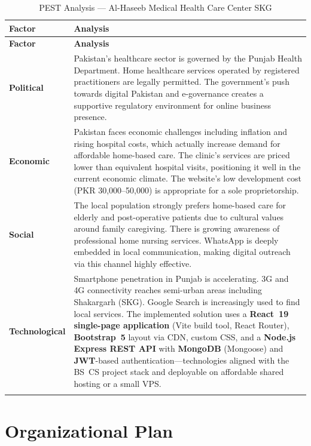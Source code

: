 \documentclass[12pt, a4paper]{article}
\begin{document}
\begin{longtable}{@{} L{3.2cm} L{11.2cm} @{}}
\toprule
\textbf{Factor} & \textbf{Analysis} \\
\midrule
\endfirsthead
\toprule
\textbf{Factor} & \textbf{Analysis} \\
\midrule
\endhead
\textbf{Political} &
Pakistan's healthcare sector is governed by the Punjab Health Department. Home healthcare services operated by registered practitioners are legally permitted. The government's push towards digital Pakistan and e-governance creates a supportive regulatory environment for online business presence. \\[6pt]
\textbf{Economic} &
Pakistan faces economic challenges including inflation and rising hospital costs, which actually increase demand for affordable home-based care. The clinic's services are priced lower than equivalent hospital visits, positioning it well in the current economic climate. The website's low development cost (PKR 30,000–50,000) is appropriate for a sole proprietorship. \\[6pt]
\textbf{Social} &
The local population strongly prefers home-based care for elderly and post-operative patients due to cultural values around family caregiving. There is growing awareness of professional home nursing services. WhatsApp is deeply embedded in local communication, making digital outreach via this channel highly effective. \\[6pt]
\textbf{Technological} &
Smartphone penetration in Punjab is accelerating. 3G and 4G connectivity reaches semi-urban areas including Shakargarh (SKG). Google Search is increasingly used to find local services. The implemented solution uses a \textbf{React~19 single-page application} (Vite build tool, React Router), \textbf{Bootstrap~5} layout via CDN, custom CSS, and a \textbf{Node.js Express REST API} with \textbf{MongoDB} (Mongoose) and \textbf{JWT}-based authentication---technologies aligned with the BS~CS project stack and deployable on affordable shared hosting or a small VPS. \\
\bottomrule
\caption{PEST Analysis — Al-Haseeb Medical Health Care Center SKG}
\end{longtable}

\newpage

\section{Organizational Plan}
\end{document}
